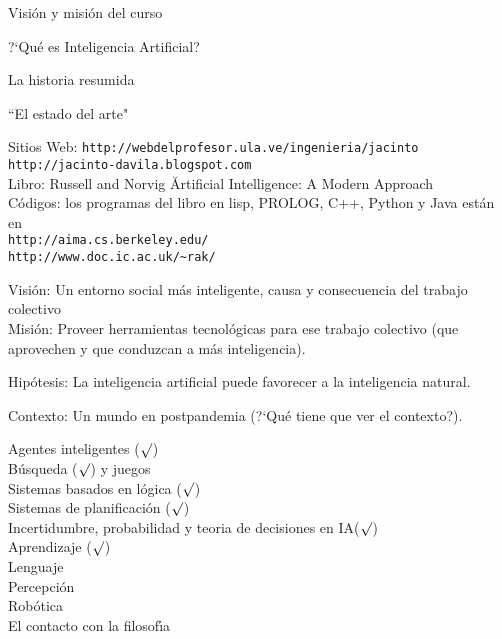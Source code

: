 \documentclass[10pt]{article}
\begin{document}

\begin{huge}

\sf


\blob Visi{\'o}n y misi{\'o}n del curso

\blob ?`Qu{\'e} es Inteligencia Artificial?

\blob La historia resumida

\blob ``El estado del arte"


Sitios Web: 
\verb|http://webdelprofesor.ula.ve/ingenieria/jacinto|\\
\verb|http://jacinto-davila.blogspot.com|\\

Libro: Russell and Norvig \u{Artificial Intelligence: A Modern Approach}\\

C{\'o}digos: los programas del libro en lisp, PROLOG, C++, Python
y Java est{\'a}n en\\

\verb|http://aima.cs.berkeley.edu/|\\
\verb|http://www.doc.ic.ac.uk/~rak/|\\



\blob Visi{\'o}n: Un entorno social m{\'a}s inteligente, causa y
consecuencia del trabajo colectivo\\

\blob Misi{\'o}n: Proveer herramientas tecnol{\'o}gicas para ese
trabajo colectivo (que aprovechen y que conduzcan a m{\'a}s
inteligencia).

\blob Hip{\'o}tesis: La inteligencia artificial puede favorecer a
la inteligencia na\-tural.

\blob Contexto: Un mundo en postpandemia (?`Qu{\'e} tiene que ver el contexto?).


\blob Agentes inteligentes ($\surd$)\\
\blob B{\'u}squeda ($\surd$) y juegos \\
\blob Sistemas basados en l{\'o}gica ($\surd$)\\
\blob Sistemas de planificaci{\'o}n ($\surd$)\\
\blob Incertidumbre, probabilidad y teoria de decisiones en IA($\surd$)\\
\blob Aprendizaje ($\surd$)\\
\blob Lenguaje\\
\blob Percepci{\'o}n\\
\blob Rob{\'o}tica\\
\blob El contacto con la filosof{\'\i}a\\



\end{huge}
\end{document}
